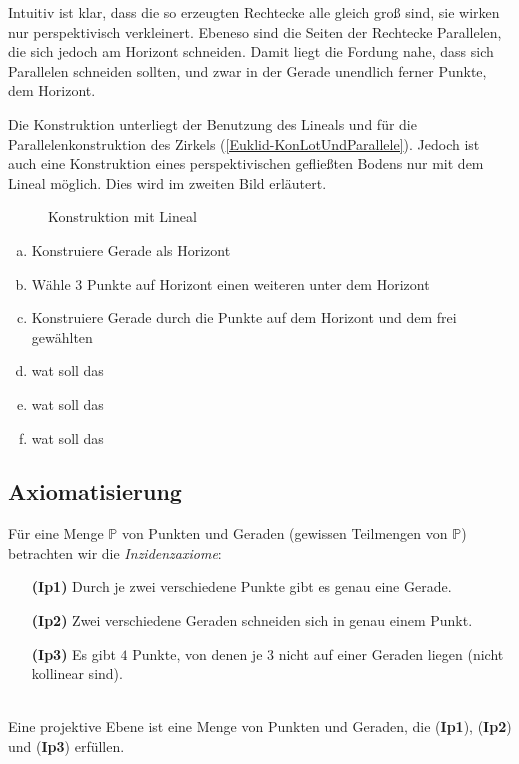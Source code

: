 Intuitiv ist klar, dass die so erzeugten Rechtecke alle gleich groß sind, sie wirken nur
perspektivisch verkleinert. Ebeneso sind die Seiten der Rechtecke Parallelen, die sich jedoch am
Horizont schneiden. Damit liegt die Fordung nahe, dass sich Parallelen schneiden sollten, und zwar
in der Gerade unendlich ferner Punkte, dem Horizont.

Die Konstruktion unterliegt der Benutzung des Lineals und für die Parallelenkonstruktion des Zirkels
(\ref{Euklid-KonLotUndParallele}). Jedoch ist auch eine Konstruktion eines perspektivischen
gefließten Bodens nur mit dem Lineal möglich. Dies wird im zweiten Bild erläutert.

\begin{figure}[h]
    
    \caption{Konstruktion mit Lineal}
\end{figure}
\begin{enumerate}[(a)]
    \item Konstruiere Gerade als Horizont
    \item Wähle $3$ Punkte auf Horizont einen weiteren unter dem Horizont
    \item Konstruiere Gerade durch die Punkte auf dem Horizont und dem frei gewählten
    \item wat soll das
    \item wat soll das
    \item wat soll das
\end{enumerate}

\subsection*{Axiomatisierung}

   Für eine Menge $\mathbb{P}$ von Punkten und Geraden (gewissen Teilmengen von 
   $\mathbb{P}$) betrachten wir die \textit{Inzidenzaxiome}:

  \begin{enumerate}
    \item[{\bf(Ip1)}] Durch je zwei verschiedene Punkte gibt es genau eine Gerade.
    \item[{\bf(Ip2)}] Zwei verschiedene Geraden schneiden sich in genau einem Punkt.
    \item[{\bf(Ip3)}] Es gibt $4$ Punkte, von denen je $3$ nicht auf einer Geraden 
                      liegen (nicht kollinear sind).
  \end{enumerate}


  \begin{defi} \ \\
    Eine projektive Ebene ist eine Menge von Punkten und Geraden, die (\textbf{Ip1}), 
    (\textbf{Ip2}) und (\textbf{Ip3}) erfüllen.
    
  \end{defi}


